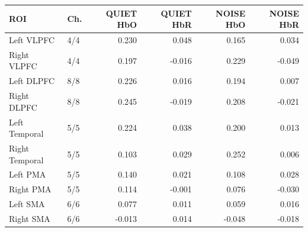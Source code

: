 \begin{tabular}{llrrrr}
\toprule
ROI & Ch. & QUIET HbO & QUIET HbR & NOISE HbO & NOISE HbR \\
\midrule
Left VLPFC & 4/4 & 0.230 & 0.048 & 0.165 & 0.034 \\
Right VLPFC & 4/4 & 0.197 & -0.016 & 0.229 & -0.049 \\
Left DLPFC & 8/8 & 0.226 & 0.016 & 0.194 & 0.007 \\
Right DLPFC & 8/8 & 0.245 & -0.019 & 0.208 & -0.021 \\
Left Temporal & 5/5 & 0.224 & 0.038 & 0.200 & 0.013 \\
Right Temporal & 5/5 & 0.103 & 0.029 & 0.252 & 0.006 \\
Left PMA & 5/5 & 0.140 & 0.021 & 0.108 & 0.028 \\
Right PMA & 5/5 & 0.114 & -0.001 & 0.076 & -0.030 \\
Left SMA & 6/6 & 0.077 & 0.011 & 0.059 & 0.016 \\
Right SMA & 6/6 & -0.013 & 0.014 & -0.048 & -0.018 \\
\bottomrule
\end{tabular}
